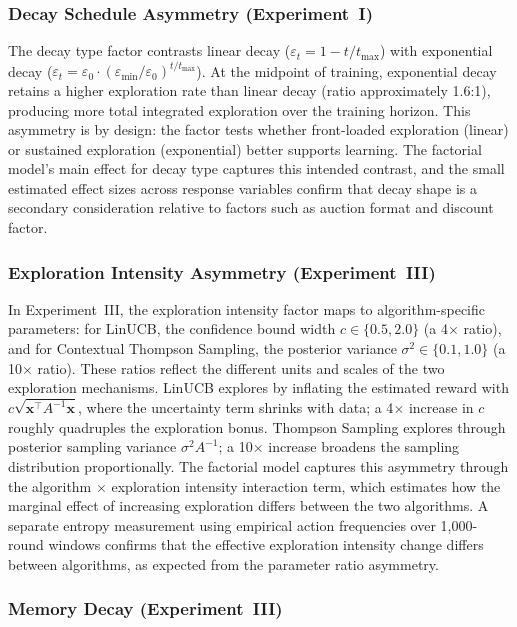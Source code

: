 \subsubsection{Decay Schedule Asymmetry (Experiment~I)}

The decay type factor contrasts linear decay ($\varepsilon_t = 1 - t/t_{\max}$) with exponential decay ($\varepsilon_t = \varepsilon_0 \cdot (\varepsilon_{\min}/\varepsilon_0)^{t/t_{\max}}$). At the midpoint of training, exponential decay retains a higher exploration rate than linear decay (ratio approximately 1.6:1), producing more total integrated exploration over the training horizon. This asymmetry is by design: the factor tests whether front-loaded exploration (linear) or sustained exploration (exponential) better supports learning. The factorial model's main effect for decay type captures this intended contrast, and the small estimated effect sizes across response variables confirm that decay shape is a secondary consideration relative to factors such as auction format and discount factor.

\subsubsection{Exploration Intensity Asymmetry (Experiment~III)}

In Experiment~III, the exploration intensity factor maps to algorithm-specific parameters: for LinUCB, the confidence bound width $c \in \{0.5, 2.0\}$ (a 4$\times$ ratio), and for Contextual Thompson Sampling, the posterior variance $\sigma^2 \in \{0.1, 1.0\}$ (a 10$\times$ ratio). These ratios reflect the different units and scales of the two exploration mechanisms. LinUCB explores by inflating the estimated reward with $c\sqrt{\mathbf{x}^\top A^{-1}\mathbf{x}}$, where the uncertainty term shrinks with data; a 4$\times$ increase in $c$ roughly quadruples the exploration bonus. Thompson Sampling explores through posterior sampling variance $\sigma^2 A^{-1}$; a 10$\times$ increase broadens the sampling distribution proportionally. The factorial model captures this asymmetry through the algorithm $\times$ exploration intensity interaction term, which estimates how the marginal effect of increasing exploration differs between the two algorithms. A separate entropy measurement using empirical action frequencies over 1{,}000-round windows confirms that the effective exploration intensity change differs between algorithms, as expected from the parameter ratio asymmetry.

\subsubsection{Memory Decay (Experiment~III)}

